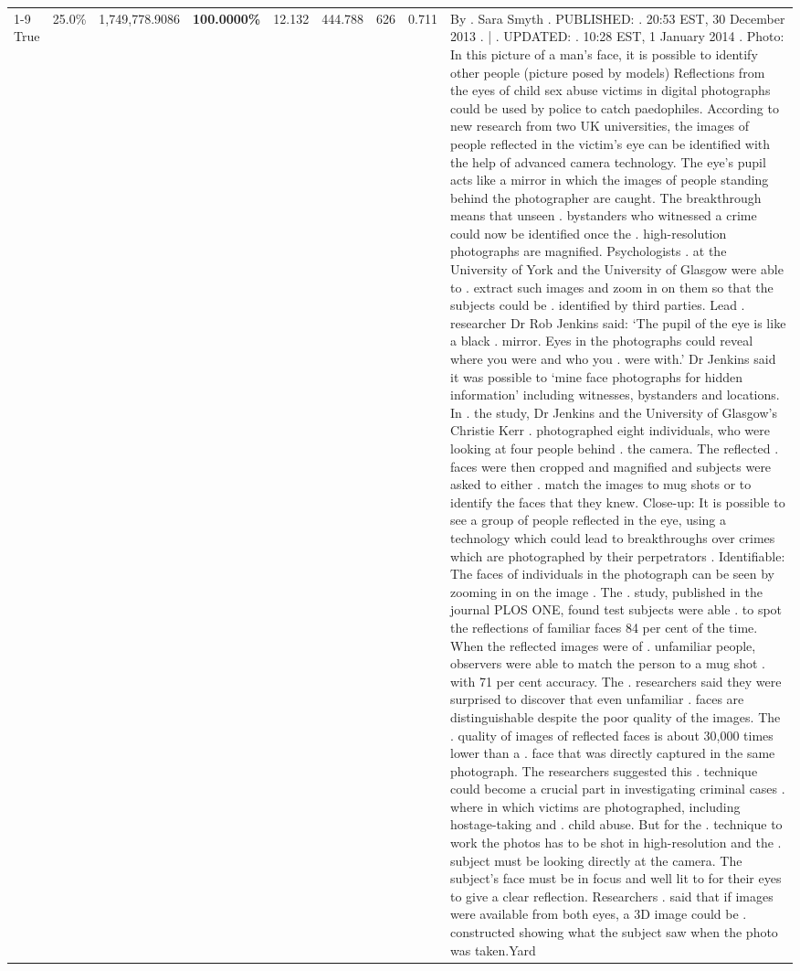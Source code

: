 \begin{table}[H]
\begin{tabular}{lllrlllll}
\cline{1-9}
True & 25.0\% & 1,749,778.9086 & \bfseries \color{red} 100.0000\% & 12.132 & 444.788 & 626 & 0.711 & By . Sara Smyth . PUBLISHED: . 20:53 EST, 30 December 2013 . | . UPDATED: . 10:28 EST, 1 January 2014 . Photo: In this picture of a man's face, it is possible to identify other people (picture posed by models) Reflections from the eyes of child sex abuse victims in digital photographs could be used by police to catch paedophiles. According to new research from two UK universities, the images of people reflected in the victim's eye can be identified with the help of advanced camera technology. The eye's pupil acts like a mirror in which the images of people standing behind the photographer are caught. The breakthrough means that unseen . bystanders who witnessed a crime could now be identified once the . high-resolution photographs are magnified. Psychologists . at the University of York and the University of Glasgow were able to . extract such images and zoom in on them so that the subjects could be . identified by third parties. Lead . researcher Dr Rob Jenkins said: ‘The pupil of the eye is like a black . mirror. Eyes in the photographs could reveal where you were and who you . were with.' Dr Jenkins said it was possible to ‘mine face photographs for hidden information' including witnesses, bystanders and locations. In . the study, Dr Jenkins and the University of Glasgow's Christie Kerr . photographed eight individuals, who were looking at four people behind . the camera. The reflected . faces were then cropped and magnified and subjects were asked to either . match the images to mug shots or to identify the faces that they knew. Close-up: It is possible to see a group of people reflected in the eye, using a technology which could lead to breakthroughs over crimes which are photographed by their perpetrators . Identifiable: The faces of individuals in the photograph can be seen by zooming in on the image . The . study, published in the journal PLOS ONE, found test subjects were able . to spot the reflections of familiar faces 84 per cent of the time. When the reflected images were of . unfamiliar people, observers were able to match the person to a mug shot . with 71 per cent accuracy. The . researchers said they were surprised to discover that even unfamiliar . faces are distinguishable despite the poor quality of the images. The . quality of images of reflected faces is about 30,000 times lower than a . face that was directly captured in the same photograph. The researchers suggested this . technique could become a crucial part in investigating criminal cases . where in which victims are photographed, including hostage-taking and . child abuse. But for the . technique to work the photos has to be shot in high-resolution and the . subject must be looking directly at the camera. The subject's face must be in focus and well lit to for their eyes to give a clear reflection. Researchers . said that if images were available from both eyes, a 3D image could be . constructed showing what the subject saw when the photo was taken.Yard \\

\end{tabular}
\end{table}
